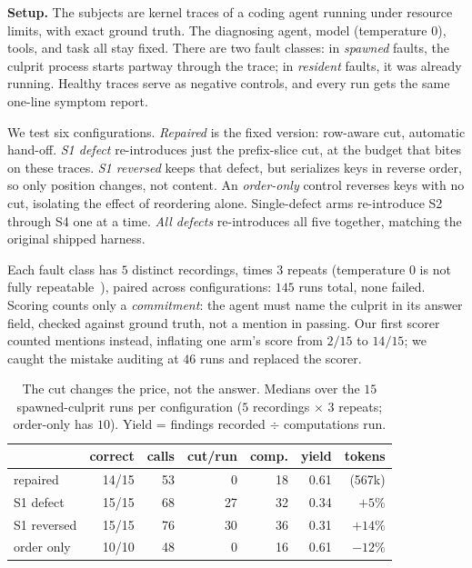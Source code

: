 \documentclass[10pt,conference]{IEEEtran}
\begin{document}
\textbf{Setup.} The subjects are kernel traces of a coding agent running
under resource limits, with exact ground truth. The diagnosing agent,
model (temperature $0$), tools, and task all stay fixed. There are two
fault classes: in \emph{spawned} faults, the culprit process starts
partway through the trace; in \emph{resident} faults, it was already
running. Healthy traces serve as negative controls, and every run gets
the same one-line symptom report.

We test six configurations. \emph{Repaired} is the fixed version:
row-aware cut, automatic hand-off. \emph{S1 defect} re-introduces just
the prefix-slice cut, at the budget that bites on these traces.
\emph{S1 reversed} keeps that defect, but serializes keys in reverse
order, so only position changes, not content. An \emph{order-only}
control reverses keys with no cut, isolating the effect of reordering
alone. Single-defect arms re-introduce S2 through S4 one at a time.
\emph{All defects} re-introduces all five together, matching the
original shipped harness.

Each fault class has $5$ distinct recordings, times $3$ repeats (temperature
$0$ is not fully repeatable~\cite{ouyang2025nondeterminism}), paired across configurations: $145$ runs total, none failed. Scoring counts
only a \emph{commitment}: the agent must name the culprit in its answer
field, checked against ground truth, not a mention in passing. Our
first scorer counted mentions instead, inflating one arm's score from
$2/15$ to $14/15$; we caught the mistake auditing at $46$ runs and
replaced the scorer.

\begin{table}[t]
\caption{The cut changes the price, not the answer. Medians over the $15$
spawned-culprit runs per configuration ($5$ recordings $\times$ $3$ repeats;
order-only has $10$). Yield = findings recorded $\div$ computations run.}
\label{tab:compensation}
\centering\scriptsize
\setlength{\tabcolsep}{3pt}
\begin{tabular}{@{}lrrrrrr@{}}
\toprule
 & \textbf{correct} & \textbf{calls} & \textbf{cut/run} & \textbf{comp.} & \textbf{yield} & \textbf{tokens} \\
\midrule
repaired         & 14/15 & 53 & 0  & 18 & 0.61 & (567k) \\
S1 defect        & 15/15 & 68 & 27 & 32 & 0.34 & $+5\%$ \\
S1 reversed      & 15/15 & 76 & 30 & 36 & 0.31 & $+14\%$ \\
order only       & 10/10 & 48 & 0  & 16 & 0.61 & $-12\%$ \\
\bottomrule
\end{tabular}
\end{table}
\end{document}
